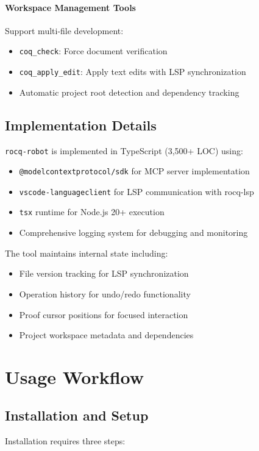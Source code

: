 \documentclass[11pt,a4paper]{article}
\newcommand{\tool}{\texttt{rocq-robot}\xspace}
\begin{document}
\paragraph{Workspace Management Tools}
Support multi-file development:
\begin{itemize}
\item \texttt{coq\_check}: Force document verification
\item \texttt{coq\_apply\_edit}: Apply text edits with LSP synchronization
\item Automatic project root detection and dependency tracking
\end{itemize}

\subsection{Implementation Details}

\tool is implemented in TypeScript (3,500+ LOC) using:
\begin{itemize}
\item \texttt{@modelcontextprotocol/sdk} for MCP server implementation
\item \texttt{vscode-languageclient} for LSP communication with rocq-lsp
\item \texttt{tsx} runtime for Node.js 20+ execution
\item Comprehensive logging system for debugging and monitoring
\end{itemize}

The tool maintains internal state including:
\begin{itemize}
\item File version tracking for LSP synchronization
\item Operation history for undo/redo functionality  
\item Proof cursor positions for focused interaction
\item Project workspace metadata and dependencies
\end{itemize}

\section{Usage Workflow}

\subsection{Installation and Setup}

Installation requires three steps:
\end{document}
